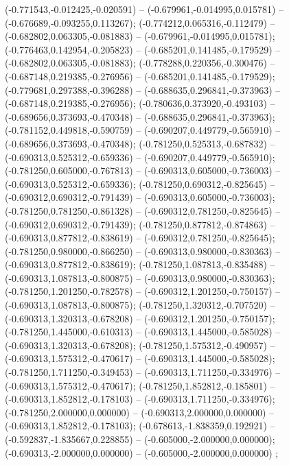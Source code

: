  (-0.771543,-0.012425,-0.020591) -- (-0.679961,-0.014995,0.015781) -- (-0.676689,-0.093255,0.113267);
 (-0.774212,0.065316,-0.112479) -- (-0.682802,0.063305,-0.081883) -- (-0.679961,-0.014995,0.015781);
 (-0.776463,0.142954,-0.205823) -- (-0.685201,0.141485,-0.179529) -- (-0.682802,0.063305,-0.081883);
 (-0.778288,0.220356,-0.300476) -- (-0.687148,0.219385,-0.276956) -- (-0.685201,0.141485,-0.179529);
 (-0.779681,0.297388,-0.396288) -- (-0.688635,0.296841,-0.373963) -- (-0.687148,0.219385,-0.276956);
 (-0.780636,0.373920,-0.493103) -- (-0.689656,0.373693,-0.470348) -- (-0.688635,0.296841,-0.373963);
 (-0.781152,0.449818,-0.590759) -- (-0.690207,0.449779,-0.565910) -- (-0.689656,0.373693,-0.470348);
 (-0.781250,0.525313,-0.687832) -- (-0.690313,0.525312,-0.659336) -- (-0.690207,0.449779,-0.565910);
 (-0.781250,0.605000,-0.767813) -- (-0.690313,0.605000,-0.736003) -- (-0.690313,0.525312,-0.659336);
 (-0.781250,0.690312,-0.825645) -- (-0.690312,0.690312,-0.791439) -- (-0.690313,0.605000,-0.736003);
 (-0.781250,0.781250,-0.861328) -- (-0.690312,0.781250,-0.825645) -- (-0.690312,0.690312,-0.791439);
 (-0.781250,0.877812,-0.874863) -- (-0.690313,0.877812,-0.838619) -- (-0.690312,0.781250,-0.825645);
 (-0.781250,0.980000,-0.866250) -- (-0.690313,0.980000,-0.830363) -- (-0.690313,0.877812,-0.838619);
 (-0.781250,1.087813,-0.835488) -- (-0.690313,1.087813,-0.800875) -- (-0.690313,0.980000,-0.830363);
 (-0.781250,1.201250,-0.782578) -- (-0.690312,1.201250,-0.750157) -- (-0.690313,1.087813,-0.800875);
 (-0.781250,1.320312,-0.707520) -- (-0.690313,1.320313,-0.678208) -- (-0.690312,1.201250,-0.750157);
 (-0.781250,1.445000,-0.610313) -- (-0.690313,1.445000,-0.585028) -- (-0.690313,1.320313,-0.678208);
 (-0.781250,1.575312,-0.490957) -- (-0.690313,1.575312,-0.470617) -- (-0.690313,1.445000,-0.585028);
 (-0.781250,1.711250,-0.349453) -- (-0.690313,1.711250,-0.334976) -- (-0.690313,1.575312,-0.470617);
 (-0.781250,1.852812,-0.185801) -- (-0.690313,1.852812,-0.178103) -- (-0.690313,1.711250,-0.334976);
 (-0.781250,2.000000,0.000000) -- (-0.690313,2.000000,0.000000) -- (-0.690313,1.852812,-0.178103);
 (-0.678613,-1.838359,0.192921) -- (-0.592837,-1.835667,0.228855) -- (-0.605000,-2.000000,0.000000);
 (-0.690313,-2.000000,0.000000) -- (-0.605000,-2.000000,0.000000) ;
